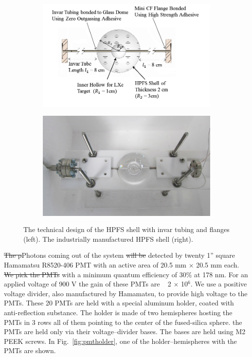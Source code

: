 \begin{figure}
\centering
\begin{subfigure}[c]{0.4\textheight}
\includegraphics[width=\textwidth]{spheredesign1.png}
\end{subfigure}
\begin{subfigure}[c]{0.25\textheight}
\includegraphics[width=\textwidth]{spherephoto.png}
\end{subfigure}
\caption{The technical design of the HPFS shell with invar tubing and flanges (left). The industrially manufactured
HPFS shell (right).} 
\label{fig:sphere}
\end{figure}


\sout{The p}Photons coming out of the system \sout{will be } detected by twenty 1'' square Hamamatsu R8520-406 PMT with an active area of 20.5 mm $\times$ 20.5 mm each. \sout{We pick the PMTs}   with a minimum quantum efficiency of 30\% at 178 nm. For an applied voltage of 900 V the gain of these PMTs are ~ 2 $\times$ 10$^6$. We use a positive voltage divider, also manufactured by Hamamatsu, to provide high voltage to the PMTs. These 20 PMTs are held with a special aluminum holder, coated with anti-reflection substance. The holder is made of two hemispheres hosting the PMTs in 
3 rows all of them pointing to the center of the fused-silica sphere. the PMTs are held only via their voltage--divider bases. 
The bases are held using M2 PEEK screws. 
In Fig.~\ref{fig:pmtholder}, one of the holder--hemispheres with the PMTs are shown.

